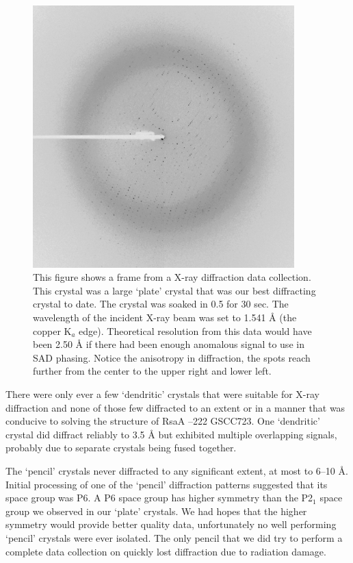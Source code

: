 \begin{figure}[htb]
  	\begin{center}
   		\includegraphics[width=0.9\textwidth]{crystal_chapter/img/rsaadiffraction.pdf}
   	\end{center}
   	\caption[A diffraction pattern of RsaA --222, `plate' crystal]{This figure shows a frame from a X-ray diffraction data collection. 
This crystal was a large `plate' crystal that was our best diffracting crystal to date. The crystal was soaked in 0.5
 \si{\molar} 
for 30 sec. The wavelength of the incident X-ray beam was set to 1.541 \AA{} (the copper K$_{a}$ edge). Theoretical resolution from this data would have been 2.50 \AA{} if there had been enough anomalous signal to use in \ac{SAD} phasing. Notice the anisotropy in diffraction, \ie the spots reach further from the center to the upper right and lower left.}
   	\label{fig:diffraction}
\end{figure}   

There were only ever a few `dendritic' crystals that were suitable for X-ray diffraction and none of those few diffracted to an extent or in a manner that was conducive to solving the structure of RsaA --222 GSCC723. One `dendritic' crystal did diffract reliably to 3.5 \AA{} but exhibited multiple overlapping signals, probably due to separate crystals being fused together.  

The `pencil' crystals never diffracted to any significant extent, at most to 6--10 \AA{}. Initial processing of one of the `pencil' diffraction patterns suggested that its space group was P6. A P6 space group has higher symmetry than the P2$_{1}$ space group we observed in our `plate' crystals. We had hopes that the higher symmetry would provide better quality data, unfortunately no well performing `pencil' crystals were ever isolated. The only pencil that we did try to perform a complete data collection on quickly lost diffraction due to radiation damage.

